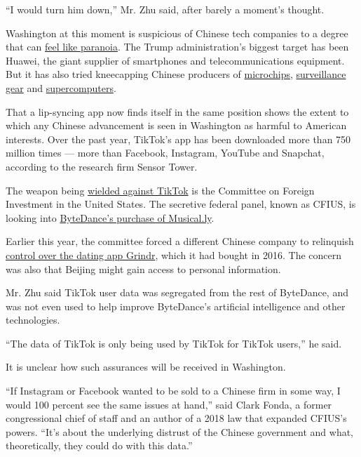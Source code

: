 ``I would turn him down,'' Mr. Zhu said, after barely a moment's
thought.

Washington at this moment is suspicious of Chinese tech companies to a
degree that can
\href{https://www.nytimes.com/2019/07/20/us/politics/china-red-scare-washington.html}{feel
like paranoia}. The Trump administration's biggest target has been
Huawei, the giant supplier of smartphones and telecommunications
equipment. But it has also tried kneecapping Chinese producers of
\href{https://www.nytimes.com/2018/10/29/us/politics/fujian-jinhua-china-sales.html}{microchips},
\href{https://www.nytimes.com/2019/10/07/us/politics/us-to-blacklist-28-chinese-entities-over-abuses-in-xinjiang.html}{surveillance
gear} and
\href{https://www.nytimes.com/2019/06/21/us/politics/us-china-trade-blacklist.html}{supercomputers}.

That a lip-syncing app now finds itself in the same position shows the
extent to which any Chinese advancement is seen in Washington as harmful
to American interests. Over the past year, TikTok's app has been
downloaded more than 750 million times --- more than Facebook,
Instagram, YouTube and Snapchat, according to the research firm Sensor
Tower.

The weapon being
\href{https://www.nytimes.com/2019/11/01/technology/tiktok-national-security-review.html}{wielded
against TikTok} is the Committee on Foreign Investment in the United
States. The secretive federal panel, known as CFIUS, is looking into
\href{https://www.nytimes.com/2017/11/10/business/dealbook/musically-sold-app-video.html}{ByteDance's
purchase of Musical.ly}.

Earlier this year, the committee forced a different Chinese company to
relinquish
\href{https://www.nytimes.com/2019/03/28/us/politics/grindr-china-national-security.html}{control
over the dating app Grindr}, which it had bought in 2016. The concern
was also that Beijing might gain access to personal information.

Mr. Zhu said TikTok user data was segregated from the rest of ByteDance,
and was not even used to help improve ByteDance's artificial
intelligence and other technologies.

``The data of TikTok is only being used by TikTok for TikTok users,'' he
said.

It is unclear how such assurances will be received in Washington.

``If Instagram or Facebook wanted to be sold to a Chinese firm in some
way, I would 100 percent see the same issues at hand,'' said Clark
Fonda, a former congressional chief of staff and an author of a 2018 law
that expanded CFIUS's powers. ``It's about the underlying distrust of
the Chinese government and what, theoretically, they could do with this
data.''

